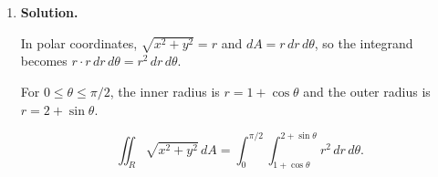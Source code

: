 \begin{enumerate}
\begin{enumerate}
\item Let $x_0$ solve $x^2+x^4=1$, so $x_0^2 = \frac{-1+\sqrt{5}}{2}$.

$R_1$ (Cartesian): $0\le x\le x_0$, $x^2\le y\le\sqrt{1-x^2}$:
\[
\iint_{R_1}(1+x^2+y^2)\,dA = \int_0^{x_0}\int_{x^2}^{\sqrt{1-x^2}}(1+x^2+y^2)\,dy\,dx.
\]

$R_2$ (Polar): the quarter-disk from $\theta=0$ to $\theta=\pi/2$, $r$ from $0$ to $1$, minus $R_1$. Alternatively, $R$ is the region in the first quadrant between $y=x^2$ and the circle, and the full integral is simply:
\[
\iint_R(1+x^2+y^2)\,dA = \int_0^{x_0}\int_{x^2}^{\sqrt{1-x^2}}(1+x^2+y^2)\,dy\,dx.
\]
If we want a polar piece for the quarter-disk portion beyond $x_0$, note that for $x_0\le x$, the parabola rises above the circle, so the region is entirely captured by the single Cartesian integral above.
\end{enumerate}

\item \textbf{Solution.}
\begin{center}
\end{center}
In polar coordinates, $\sqrt{x^2+y^2} = r$ and $dA = r\,dr\,d\theta$, so the integrand becomes $r\cdot r\,dr\,d\theta = r^2\,dr\,d\theta$.

For $0\le\theta\le\pi/2$, the inner radius is $r = 1+\cos\theta$ and the outer radius is $r = 2+\sin\theta$.

\[
\boxed{\iint_R\sqrt{x^2+y^2}\,dA = \int_0^{\pi/2}\int_{1+\cos\theta}^{2+\sin\theta} r^2\,dr\,d\theta}.
\]


\end{enumerate}
